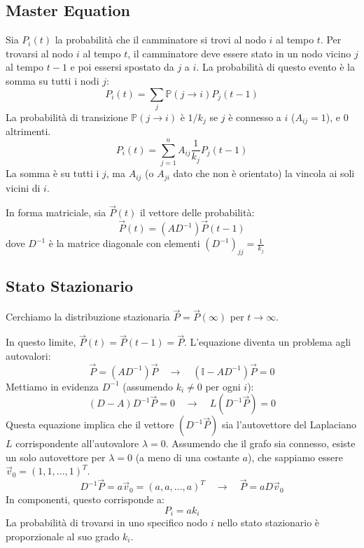	\subsection{Master Equation}
	Sia $P_i(t)$ la probabilità che il camminatore si trovi al nodo $i$ al tempo $t$.
	Per trovarsi al nodo $i$ al tempo $t$, il camminatore deve essere stato in un nodo vicino $j$ al tempo $t-1$ e poi essersi spostato da $j$ a $i$. La probabilità di questo evento è la somma su tutti i nodi $j$:
	\begin{equation}
	    P_i(t) = \sum_{j} \mathbb{P}(j \to i) P_j(t-1)
	\end{equation}
	La probabilità di transizione $\mathbb{P}(j \to i)$ è $1/k_j$ se $j$ è connesso a $i$ ($A_{ij}=1$), e 0 altrimenti.
	\begin{equation}
	    P_i(t) = \sum_{j=1}^{n} A_{ij} \frac{1}{k_j} P_j(t-1)
	\end{equation}
	La somma è su tutti i $j$, ma $A_{ij}$ (o $A_{ji}$ dato che non è orientato) la vincola ai soli vicini di $i$.
	
	\noindent In forma matriciale, sia $\vec{P}(t)$ il vettore delle probabilità:
	\begin{equation}
	    \vec{P}(t) = (A D^{-1}) \vec{P}(t-1)
	\end{equation}
	dove $D^{-1}$ è la matrice diagonale con elementi $(D^{-1})_{jj} = \frac{1}{k_j}$
	
	\subsection{Stato Stazionario}
	Cerchiamo la distribuzione stazionaria $\vec{P} = \vec{P}(\infty)$ per $t \to \infty$. 
    
    \noindent In questo limite, $\vec{P}(t) = \vec{P}(t-1) = \vec{P}$. L'equazione diventa un problema agli autovalori:
	\begin{equation}
	    \vec{P} = (A D^{-1}) \vec{P} \quad \longrightarrow \quad (\mathbb{I} - A D^{-1}) \vec{P} = 0
	\end{equation}
	Mettiamo in evidenza $D^{-1}$ (assumendo $k_i \neq 0$ per ogni $i$):
    \begin{equation}
        (D - A) D^{-1} \vec{P} = 0 \quad \longrightarrow \quad L (D^{-1} \vec{P}) = 0
    \end{equation}
	Questa equazione implica che il vettore $(D^{-1} \vec{P})$ sia l'autovettore del Laplaciano $L$ corrispondente all'autovalore $\lambda = 0$.
	Assumendo che il grafo sia connesso, esiste un solo autovettore per $\lambda=0$ (a meno di una costante $a$), che sappiamo essere $\vec{v}_0 = (1, 1, ..., 1)^T$.
	\begin{equation}
	    D^{-1} \vec{P} = a \vec{v}_0 = (a, a, ..., a)^T \quad \longrightarrow \quad \vec{P} = a D \vec{v}_0
	\end{equation}
	In componenti, questo corrisponde a:
	\begin{equation}
    P_i = a k_i
    \end{equation}
    La probabilità di trovarsi in uno specifico nodo $i$ nello stato stazionario è proporzionale al suo grado $k_i$.
	

